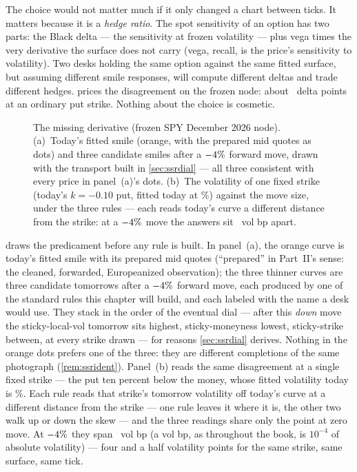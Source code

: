The choice would not matter much if it only changed a chart between
ticks.  It matters because it is a \emph{hedge ratio}.  The spot
sensitivity of an option has two parts: the Black delta --- the
sensitivity at frozen volatility --- plus vega times the very
derivative the surface does not carry (vega, recall, is the price's
sensitivity to volatility).  Two desks holding the same option against
the same fitted surface, but assuming different smile responses, will
compute different deltas and trade different hedges.
 prices the disagreement on the frozen node: about
\MacSsrDeltaGapPts\ delta points at an ordinary put strike.  Nothing
about the choice is cosmetic.

\begin{figure}[htbp]
\centering
{}
\caption{The missing derivative (frozen SPY December 2026 node).
(a)~Today's fitted smile (orange, with the prepared mid quotes as
dots) and three candidate smiles after a $-4\%$
forward move, drawn with the transport built in
\cref{sec:ssrdial} --- all three consistent with every price in
panel~(a)'s dots.  (b)~The volatility of one fixed strike (today's
$k=-0.10$ put, fitted today at \MacSsrMarkVolPct\%) against the move
size,
under the three rules --- each reads today's curve a different
distance from the strike: at a $-4\%$ move the answers
sit \MacSsrMarkSpreadBp\ vol bp apart.}
\label{fig:ssrquestion}
\end{figure}

 draws the predicament before any rule is built.  In
panel~(a), the orange curve is today's fitted smile with its prepared
mid quotes (``prepared'' in Part~II's sense: the cleaned, forwarded,
Europeanized observation); the three thinner curves are three
candidate tomorrows after a $-4\%$ forward move, each
produced by one of the standard rules this chapter will build, and
each labeled with the name a desk would use.  They stack in the order
of the eventual dial --- after this \emph{down} move the
sticky-local-vol tomorrow sits highest, sticky-moneyness lowest,
sticky-strike between, at every strike drawn --- for reasons
\cref{sec:ssrdial} derives.  Nothing in the orange dots prefers one
of the three: they are different completions of the same photograph
(\cref{rem:ssrident}).  Panel~(b) reads the same disagreement at a
single fixed strike --- the put ten percent below the money, whose
fitted volatility today is \MacSsrMarkVolPct\%.  Each rule reads that
strike's tomorrow volatility off today's curve at a different
distance from the strike --- one rule leaves it where it is, the
other two walk up or down the skew --- and the three readings share
only the point at zero move.  At $-4\%$ they span
\MacSsrMarkSpreadBp\ vol bp (a vol bp, as throughout the book, is
$10^{-4}$ of absolute volatility) --- four and a half volatility
points for the same strike, same surface, same tick.

